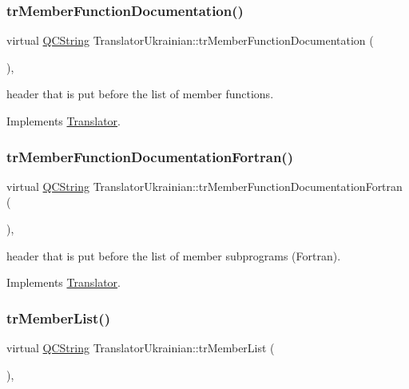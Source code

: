 \subsubsection{\texorpdfstring{trMemberFunctionDocumentation()}{trMemberFunctionDocumentation()}}
{\footnotesize\ttfamily virtual \mbox{\hyperlink{class_q_c_string}{Q\+C\+String}} Translator\+Ukrainian\+::tr\+Member\+Function\+Documentation (\begin{DoxyParamCaption}{ }\end{DoxyParamCaption})\hspace{0.3cm}{\ttfamily [inline]}, {\ttfamily [virtual]}}

header that is put before the list of member functions. 

Implements \mbox{\hyperlink{class_translator}{Translator}}.

\mbox{\label{class_translator_ukrainian_a8c363a0f8dc2714c0c13a2c03bf96368}} 
\subsubsection{\texorpdfstring{trMemberFunctionDocumentationFortran()}{trMemberFunctionDocumentationFortran()}}
{\footnotesize\ttfamily virtual \mbox{\hyperlink{class_q_c_string}{Q\+C\+String}} Translator\+Ukrainian\+::tr\+Member\+Function\+Documentation\+Fortran (\begin{DoxyParamCaption}{ }\end{DoxyParamCaption})\hspace{0.3cm}{\ttfamily [inline]}, {\ttfamily [virtual]}}

header that is put before the list of member subprograms (Fortran). 

Implements \mbox{\hyperlink{class_translator}{Translator}}.

\mbox{\label{class_translator_ukrainian_a2ece872ccb705b37f1aa0bd2d80e255e}} 
\subsubsection{\texorpdfstring{trMemberList()}{trMemberList()}}
{\footnotesize\ttfamily virtual \mbox{\hyperlink{class_q_c_string}{Q\+C\+String}} Translator\+Ukrainian\+::tr\+Member\+List (\begin{DoxyParamCaption}{ }\end{DoxyParamCaption})\hspace{0.3cm}{\ttfamily [inline]}, {\ttfamily [virtual]}}

